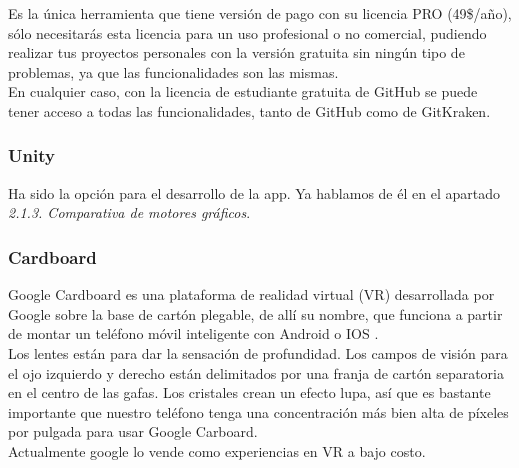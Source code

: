 \quad Es la única herramienta que tiene versión de pago con su licencia PRO (49\$/año), sólo necesitarás esta licencia para un uso profesional o no comercial, pudiendo realizar tus proyectos personales con la versión gratuita sin ningún tipo de problemas, ya que las funcionalidades son las mismas.\\

\quad En cualquier caso, con la licencia de estudiante gratuita de GitHub se puede tener acceso a todas las funcionalidades, tanto de GitHub como de GitKraken.\\


	\subsubsection{Unity}

\quad Ha sido la opción para el desarrollo de la app. Ya hablamos de él en el apartado \textit{2.1.3. Comparativa de motores gráficos}.
	
	\subsubsection{Cardboard}

\quad Google Cardboard es una plataforma de realidad virtual (VR) desarrollada por Google sobre la base de cartón plegable, de allí su nombre, que funciona a partir de montar un teléfono móvil inteligente con Android o IOS \cite{Cardboard}.\\

\quad Los lentes están para dar la sensación de profundidad. Los campos de visión para el ojo izquierdo y derecho están delimitados por una franja de cartón separatoria en el centro de las gafas. Los cristales crean un efecto lupa, así que es bastante importante que nuestro teléfono tenga una concentración más bien alta de píxeles por pulgada para usar Google Carboard. \\

\quad Actualmente google lo vende como experiencias en VR a bajo costo.\\

\newpage






